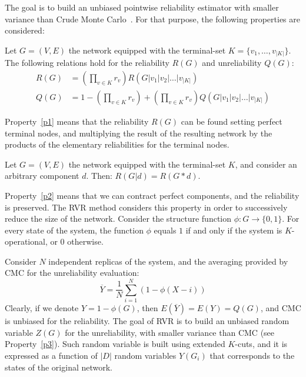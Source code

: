 The goal is to build an unbiased pointwise reliability estimator with smaller variance than 
Crude Monte Carlo~\cite{4}. For that purpose, the following properties are considered:

\begin{property}\label{p1}
Let $G=(V,E)$ the network equipped with the terminal-set $K=\{v_1,\ldots,v_{|K|}\}$. 
The following relations hold for the reliability $R(G)$ and unreliability $Q(G)$: 
\begin{align}
R(G) &= \left(\prod_{v\in K}r_v\right) R(G|v_1|v_2|\ldots|v_{|K|})\\
Q(G) &= 1-\left(\prod_{v\in K}r_v\right)+\left(\prod_{v\in K}r_v\right)Q(G|v_1|v_2|\ldots|v_{|K|})
\end{align}
\end{property}

Property~\ref{p1} means that the reliability $R(G)$ can be found setting perfect terminal nodes, 
and multiplying the result of the resulting network by the products of the elementary reliabilities for the 
terminal nodes. 

\begin{property}\label{p2}
Let $G=(V,E)$ the network equipped with the terminal-set $K$, and consider an arbitrary component $d$. 
Then: $R(G|d)=R(G*d)$.
\end{property}

Property~\ref{p2} means that we can contract perfect components, and the reliability is preserved. 
The RVR method considers this property in order to successively reduce the size of the network. 
Consider the structure function $\phi:G \to \{0,1\}$. For every state of the system, the 
function $\phi$ equals $1$ if and only if the system is $K$-operational, or $0$ otherwise. 

Consider $N$ independent replicas of the system, and the averaging provided by CMC for the 
unreliability evaluation:
\begin{equation}
\overline{Y}= \frac{1}{N}\sum_{i=1}^{N}(1-\phi(X-i))
\end{equation}
Clearly, if we denote $Y=1-\phi(G)$, then $E(\overline{Y}) =E(Y)=Q(G)$, and CMC is unbiased for the reliability.
The goal of RVR is to build an unbiased random variable $Z(G)$ for the unreliability, with smaller 
variance than CMC (see Property~\ref{p3}). Such random variable is built using extended 
$K$-cuts, and it is expressed as a function of $|D|$ random variables $Y(G_i)$ that corresponds to the 
states of the original network.

